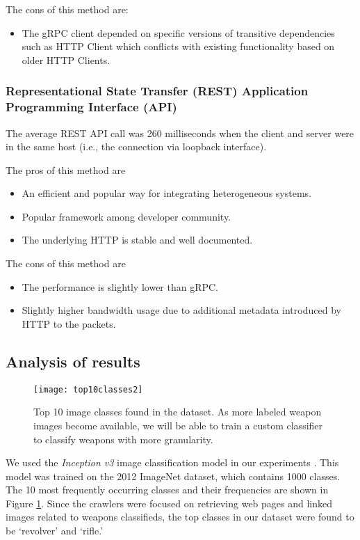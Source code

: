 The cons of this method are:
\begin{itemize}
	\item The gRPC client depended on specific versions of transitive dependencies such as HTTP Client which conflicts with existing functionality based on older HTTP Clients.
\end{itemize}

\subsubsection{Representational State Transfer (REST) Application Programming Interface (API)} \label{sec:eval-rest}

The average REST API call was 260 milliseconds when the client and server were in the same host (i.e., the connection via loopback interface).

The pros of this method are
\begin{itemize}
	\item An efficient and popular way for integrating heterogeneous systems.
	\item Popular framework among developer community.
	\item The underlying HTTP is stable and well documented.
\end{itemize}

The cons of this method are
\begin{itemize}
	\item The performance is slightly lower than gRPC.
	\item Slightly higher bandwidth usage due to additional metadata introduced by HTTP to the packets.
\end{itemize}
\fi  %

\subsection{Analysis of results}
\begin{figure}[h]
	\texttt{[image: top10classes2]}
	\caption{Top 10 image classes found in the dataset. As more labeled weapon images become available, we will be able to train a custom classifier to classify weapons with more granularity.}
	\label{fig:top10ImgClass}
\end{figure}
We used the \textit{Inception v3} image classification model in our experiments \cite{SzegedyVISW15}. This model was trained on the 2012 ImageNet dataset, which contains 1000 classes\cite{ILSVRC15}.
The 10 most frequently occurring classes and their frequencies are shown in Figure \ref{fig:top10ImgClass}. Since the crawlers were focused on retrieving web pages and linked images related to weapons classifieds, the top classes in our dataset were found to be `revolver' and `rifle.'

